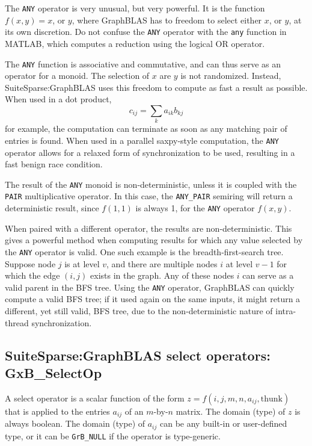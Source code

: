 \documentclass[12pt]{article}
\begin{document}
The \verb'ANY' operator is very unusual, but very powerful.  It is the function
$f(x,y)=x$, or $y$, where GraphBLAS has to freedom to select either $x$, or
$y$, at its own discretion.  Do not confuse the \verb'ANY' operator with the
\verb'any' function in MATLAB, which computes a reduction using the logical OR
operator.

The \verb'ANY' function is associative and commutative, and can thus serve as
an operator for a monoid.  The selection of $x$ are $y$ is not randomized.
Instead, SuiteSparse:GraphBLAS uses this freedom to compute as fast a result as
possible.  When used in a dot product, \[ c_{ij} = \sum_k a_{ik} b_{kj} \] for
example, the computation can terminate as soon as any matching pair of entries
is found.  When used in a parallel saxpy-style computation, the \verb'ANY'
operator allows for a relaxed form of synchronization to be used, resulting
in a fast benign race condition.

The result of the \verb'ANY' monoid is non-deterministic, unless it is
coupled with the \verb'PAIR' multiplicative operator.  In this case,
the \verb'ANY_PAIR' semiring will return a deterministic result,
since $f(1,1)$ is always 1, for the \verb'ANY' operator $f(x,y)$.

When paired with a different operator, the results are non-deterministic.  This
gives a powerful method when computing results for which any value selected by
the \verb'ANY' operator is valid.  One such example is the breadth-first-search
tree.  Suppose node $j$ is at level $v$, and there are multiple nodes $i$ at
level $v-1$ for which the edge $(i,j)$ exists in the graph.  Any of these nodes
$i$ can serve as a valid parent in the BFS tree.  Using the \verb'ANY'
operator, GraphBLAS can quickly compute a valid BFS tree; if it used again on
the same inputs, it might return a different, yet still valid, BFS tree, due to
the non-deterministic nature of intra-thread synchronization.

\newpage
\subsection{SuiteSparse:GraphBLAS select operators: {\sf GxB\_SelectOp}} %
\label{selectop}

A select operator is a scalar function of the form
$z=f(i,j,m,n,a_{ij},\mbox{thunk})$ that is applied to the entries $a_{ij}$ of
an $m$-by-$n$ matrix.  The domain (type) of $z$ is always boolean.  The domain
(type) of $a_{ij}$ can be any built-in or user-defined type, or it can be
\verb'GrB_NULL' if the operator is type-generic.
\end{document}
